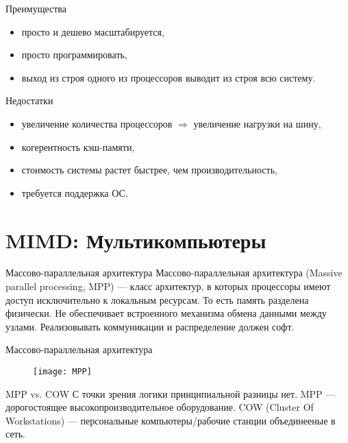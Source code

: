 \begin{frame}{Преимущества}
\begin{itemize}
    \item просто и дешево масштабируется,
    \item просто программировать,
    \item выход из строя одного из процессоров выводит из строя всю систему.
\end{itemize}
\end{frame}

\begin{frame}{Недостатки}
\begin{itemize}
    \item увеличение количества процессоров $\Rightarrow$ увеличение нагрузки на шину,
    \item когерентность кэш-памяти,
    \item стоимость системы растет быстрее, чем производительность,
    \item требуется поддержка ОС.
\end{itemize}
\end{frame}

\section{MIMD: Мультикомпьютеры}

\begin{frame}{Массово-параллельная архитектура}
Массово-параллельная архитектура (\abbr Massive parallel processing, MPP) --- класс архитектур, в которых процессоры имеют доступ исключительно к локальным ресурсам. То есть память разделена физически.
\vfill
Не обеспечивает встроенного механизма обмена данными между узлами. Реализовывать коммуникации и распределение должен софт.
\end{frame}

\begin{frame}{Массово-параллельная архитектура}
\begin{figure}[htpb]
    \centering
    \texttt{[image: MPP]}
\end{figure}
\end{frame}

\begin{frame}{MPP vs. COW}
\vfill
С точки зрения логики принципиальной разницы нет.
\vfill
MPP --- дорогостоящее высокопроизводительное оборудование.
\vfill
COW (Cluster Of Workstations) --- персональные компьютеры/рабочие станции
объединееные в сеть.
\end{frame}

